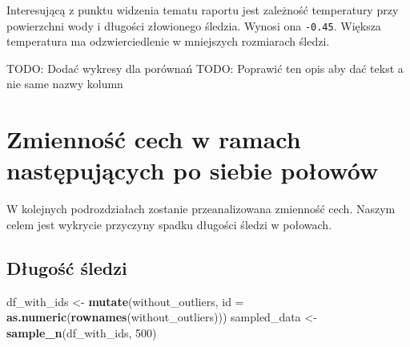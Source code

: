 \documentclass[]{article}
\newenvironment{Shaded}{\begin{snugshade}}{\end{snugshade}}
\newcommand{\DataTypeTok}[1]{\textcolor[rgb]{0.13,0.29,0.53}{#1}}
\newcommand{\DecValTok}[1]{\textcolor[rgb]{0.00,0.00,0.81}{#1}}
\newcommand{\KeywordTok}[1]{\textcolor[rgb]{0.13,0.29,0.53}{\textbf{#1}}}
\newcommand{\NormalTok}[1]{#1}
\newcommand{\StringTok}[1]{\textcolor[rgb]{0.31,0.60,0.02}{#1}}
\begin{document}
Interesującą z punktu widzenia tematu raportu jest zależność temperatury
przy powierzchni wody i długości złowionego śledzia. Wynosi ona
\texttt{-0.45}. Większa temperatura ma odzwierciedlenie w mniejszych
rozmiarach śledzi.

TODO: Dodać wykresy dla porównań TODO: Poprawić ten opis aby dać tekst a
nie same nazwy kolumn

\hypertarget{zmiennoux15bux107-cech-w-ramach-nastux119pujux105cych-po-siebie-poux142owuxf3w}{%
\section{Zmienność cech w ramach następujących po siebie
połowów}\label{zmiennoux15bux107-cech-w-ramach-nastux119pujux105cych-po-siebie-poux142owuxf3w}}

W kolejnych podrozdziałach zostanie przeanalizowana zmienność cech.
Naszym celem jest wykrycie przyczyny spadku długości śledzi w połowach.

\hypertarget{dux142ugoux15bux107-ux15bledzi}{%
\subsection{Długość śledzi}\label{dux142ugoux15bux107-ux15bledzi}}

\begin{Shaded}
\begin{Highlighting}[]
\NormalTok{df_with_ids <-}\StringTok{ }\KeywordTok{mutate}\NormalTok{(without_outliers, }\DataTypeTok{id =} \KeywordTok{as.numeric}\NormalTok{(}\KeywordTok{rownames}\NormalTok{(without_outliers)))}
\NormalTok{sampled_data <-}\StringTok{ }\KeywordTok{sample_n}\NormalTok{(df_with_ids, }\DecValTok{500}\NormalTok{)}
\end{Highlighting}
\end{Shaded}
\end{document}

